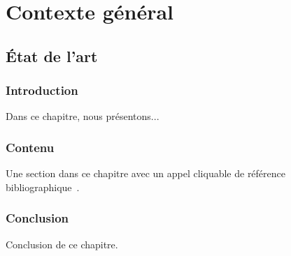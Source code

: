 \documentclass[a4paper,11pt,twoside]{memoir}
\begin{document}









\part{Contexte général}





\chapter{\'Etat de l'art}
\label{chap:articles}

\adjustmtc
\minitoc

\section{Introduction}
Dans ce chapitre, nous présentons...

\section{Contenu}
Une section dans ce chapitre avec un appel cliquable de référence
bibliographique~\cite{grouin-2014jbi}.

\section{Conclusion}
Conclusion de ce chapitre.
\end{document}
